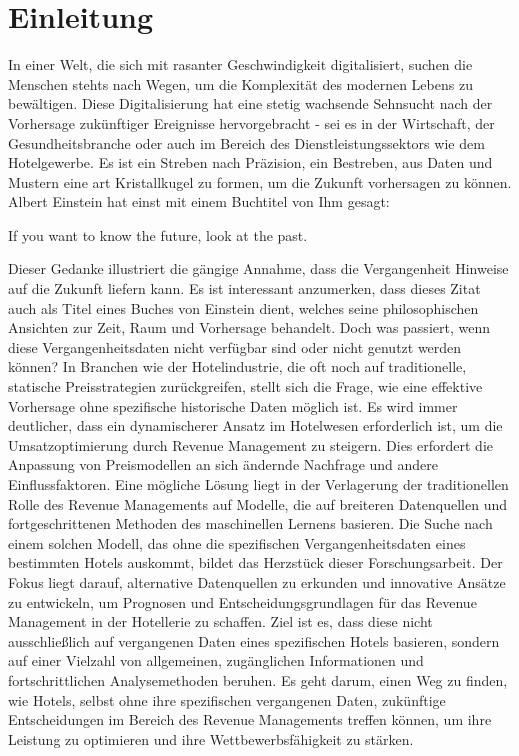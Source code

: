 \chapter{Einleitung}
\label{chap:einleitung}
In einer Welt, die sich mit rasanter Geschwindigkeit digitalisiert, suchen die Menschen stehts nach Wegen, um die Komplexität des modernen Lebens zu bewältigen. Diese Digitalisierung hat eine stetig wachsende Sehnsucht nach der Vorhersage zukünftiger Ereignisse hervorgebracht - sei es in der Wirtschaft, der Gesundheitsbranche oder auch im Bereich des Dienstleistungssektors wie dem Hotelgewerbe. Es ist ein Streben nach Präzision, ein Bestreben, aus Daten und Mustern eine art Kristallkugel zu formen, um die Zukunft vorhersagen zu können.
\newline
\newline
Albert Einstein hat einst mit einem Buchtitel von Ihm gesagt: 
\begin{zitat}
    If you want to know the future, look at the past. \cite{AE_zitat}
\end{zitat}
Dieser Gedanke illustriert die gängige Annahme, dass die Vergangenheit Hinweise auf die Zukunft liefern kann. Es ist interessant anzumerken, dass dieses Zitat auch als Titel eines Buches von Einstein dient, welches seine philosophischen Ansichten zur Zeit, Raum und Vorhersage behandelt.
\newline
\newline
Doch was passiert, wenn diese Vergangenheitsdaten nicht verfügbar sind oder nicht genutzt werden können? In Branchen wie der Hotelindustrie, die oft noch auf traditionelle, statische Preisstrategien zurückgreifen, stellt sich die Frage, wie eine effektive Vorhersage ohne spezifische historische Daten möglich ist. 
\newline
\newline
Es wird immer deutlicher, dass ein dynamischerer Ansatz im Hotelwesen erforderlich ist, um die Umsatzoptimierung durch Revenue Management zu steigern. Dies erfordert die Anpassung von Preismodellen an sich ändernde Nachfrage und andere Einflussfaktoren. Eine mögliche Lösung liegt in der Verlagerung der traditionellen Rolle des Revenue Managements auf Modelle, die auf breiteren Datenquellen und fortgeschrittenen Methoden des maschinellen Lernens basieren.
\newline 
\newline
Die Suche nach einem solchen Modell, das ohne die spezifischen Vergangenheitsdaten eines bestimmten Hotels auskommt, bildet das Herzstück dieser Forschungsarbeit. Der Fokus liegt darauf, alternative Datenquellen zu erkunden und innovative Ansätze zu entwickeln, um Prognosen und Entscheidungsgrundlagen für das Revenue Management in der Hotellerie zu schaffen. Ziel ist es, dass diese nicht ausschließlich auf vergangenen Daten eines spezifischen Hotels basieren, sondern auf einer Vielzahl von allgemeinen, zugänglichen Informationen und fortschrittlichen Analysemethoden beruhen. Es geht darum, einen Weg zu finden, wie Hotels, selbst ohne ihre spezifischen vergangenen Daten, zukünftige Entscheidungen im Bereich des Revenue Managements treffen können, um ihre Leistung zu optimieren und ihre Wettbewerbsfähigkeit zu stärken.